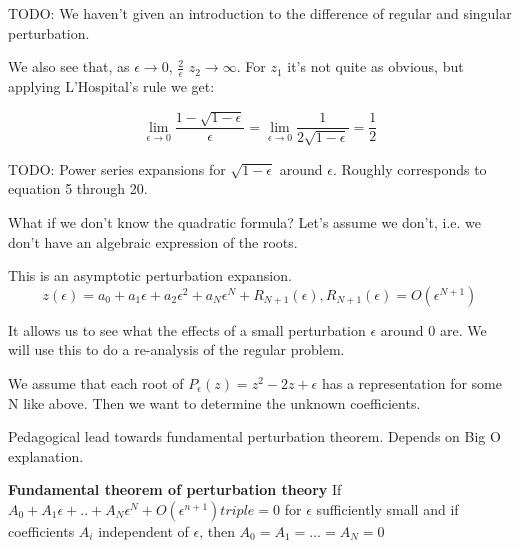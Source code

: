 \documentclass[12pt]{report}
\begin{document}
TODO: We haven't given an introduction to the difference of regular
and singular perturbation.

We also see that, as $\epsilon \to 0$, $\frac{2}{\epsilon}$
$z_2 \rightarrow \infty$. For $z_1$ it's not quite as obvious, but
applying L'Hospital's rule we get:

\begin{equation}
  \lim_{\epsilon \to 0} \frac{1 - \sqrt{1-\epsilon}}{\epsilon} =
  \lim_{\epsilon \to 0} \frac{1}{2\sqrt{1-\epsilon}} = \frac{1}{2}
\end{equation}

TODO: Power series expansions for $\sqrt{1-\epsilon}$ around
$\epsilon$. Roughly corresponds to equation 5 through 20.

What if we don't know the quadratic formula? Let's assume we don't,
i.e. we don't have an algebraic expression of the roots.

This is an asymptotic perturbation expansion.
\begin{equation}
  z(\epsilon) = a_0 + a_1\epsilon + a_2\epsilon^2 + a_N\epsilon^N +
  R_{N+1}(\epsilon), R_{N+1}(\epsilon) = O(\epsilon^{N+1})
\end{equation}

It allows us to see what the effects of a small perturbation
$\epsilon$ around 0 are. We will use this to do a re-analysis of the
regular problem.

We assume that each root of $P_\epsilon(z) = z^2 - 2z + \epsilon$ has
a representation for some N like above. Then we want to determine the
unknown coefficients.

Pedagogical lead towards fundamental perturbation theorem. Depends on Big O
explanation.

\textbf{Fundamental theorem of perturbation theory}
If $A_0 + A_1\epsilon + .. + A_N\epsilon^N + O(\epsilon^{n+1}) triple
= 0$ for $\epsilon$ sufficiently small and if coefficients $A_i$
independent of $\epsilon$, then $A_0=A_1=...=A_N=0$
\end{document}
